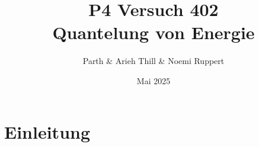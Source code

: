 \documentclass[ngerman]{scrartcl}
\title{P4 Versuch 402 \\[1ex] \large Quantelung von Energie}
\author{Parth \& Arieh Thill \& Noemi Ruppert}
\date{Mai 2025}
\begin{document}
\maketitle
\clearpage
\tableofcontents
\clearpage
\section{Einleitung}

\clearpage
\end{document}
